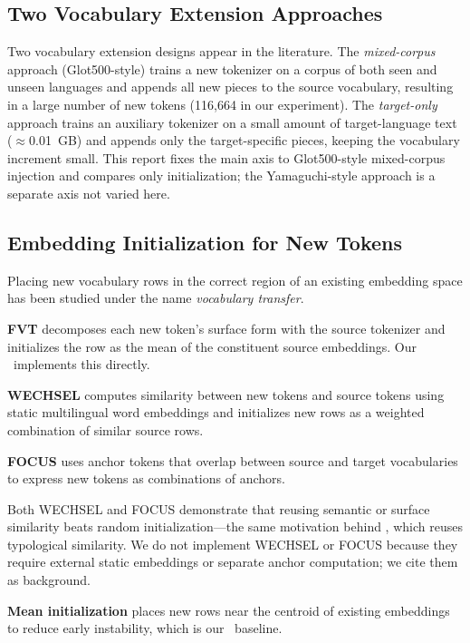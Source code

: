 \subsection{Two Vocabulary Extension Approaches}

Two vocabulary extension designs appear in the literature.
The \emph{mixed-corpus} approach (Glot500-style) trains a new tokenizer on a corpus of
both seen and unseen languages and appends all new pieces to the source vocabulary,
resulting in a large number of new tokens (116,664 in our experiment).
The \emph{target-only} approach \citep{yamaguchi2025vocab} trains an auxiliary tokenizer
on a small amount of target-language text ($\approx$0.01~GB) and appends only the target-specific
pieces, keeping the vocabulary increment small.
This report fixes the main axis to Glot500-style mixed-corpus injection and compares only
initialization; the Yamaguchi-style approach is a separate axis not varied here.

\subsection{Embedding Initialization for New Tokens}

Placing new vocabulary rows in the correct region of an existing embedding space has been
studied under the name \emph{vocabulary transfer}.

\textbf{FVT} \citep{gee2022fvt} decomposes each new token's surface form with the source
tokenizer and initializes the row as the mean of the constituent source embeddings.
Our \fvt\ implements this directly.

\textbf{WECHSEL} \citep{minixhofer2022wechsel} computes similarity between new tokens and
source tokens using static multilingual word embeddings and initializes new rows as
a weighted combination of similar source rows.

\textbf{FOCUS} \citep{dobler2023focus} uses anchor tokens that overlap between source and
target vocabularies to express new tokens as combinations of anchors.

Both WECHSEL and FOCUS demonstrate that reusing semantic or surface similarity beats
random initialization---the same motivation behind \famm, which reuses typological similarity.
We do not implement WECHSEL or FOCUS because they require external static embeddings or
separate anchor computation; we cite them as background.

\textbf{Mean initialization} \citep{hewitt2021newembeddings} places new rows near the
centroid of existing embeddings to reduce early instability, which is our \meanm\ baseline.

